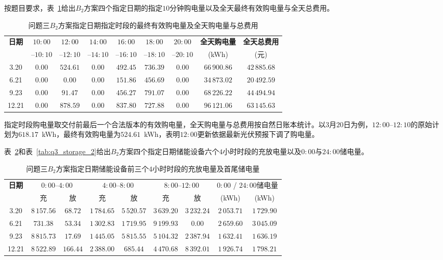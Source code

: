 \documentclass[12pt,a4paper]{ctexart}
\theoremstyle{definition}
\theoremstyle{plain}
\theoremstyle{remark}
\begin{document}
按题目要求，表~\ref{tab:q3_purchase_specified}给出$B_2$方案四个指定日期的指定$10$分钟购电量以及全天最终有效购电量与全天总费用。

\begin{table}[H]
\centering
\caption{问题三$B_2$方案指定日期指定时段的最终有效购电量及全天购电量与总费用}
\label{tab:q3_purchase_specified}
\begin{tabular}{c|cccccc|cc}
\toprule
\textbf{日期} & $10{:}00$ & $12{:}00$ & $14{:}00$ & $16{:}00$ & $18{:}00$ & $20{:}00$ & \textbf{全天购电量} & \textbf{全天总费用} \\
 & --$10{:}10$ & --$12{:}10$ & --$14{:}10$ & --$16{:}10$ & --$18{:}10$ & --$20{:}10$ & (kWh) & (元) \\
\midrule
3.20 & $0.00$ & $524.61$ & $0.00$ & $492.45$ & $736.39$ & $0.00$ & $66\,900.86$ & $42\,885.68$ \\
6.21 & $0.00$ & $0.00$ & $0.00$ & $151.86$ & $456.69$ & $0.00$ & $34\,873.02$ & $20\,492.59$ \\
9.23 & $0.00$ & $91.47$ & $0.00$ & $456.27$ & $791.07$ & $0.00$ & $68\,226.22$ & $44\,494.94$ \\
12.21 & $0.00$ & $878.59$ & $0.00$ & $837.80$ & $727.88$ & $0.00$ & $96\,121.06$ & $63\,145.63$ \\
\bottomrule
\end{tabular}
\end{table}

\noindent 指定时段购电量取交付前最后一个合法版本的有效购电量，全天购电量与总费用按自然日账本统计。以$3$月$20$日为例，$12{:}00$--$12{:}10$的原始计划为$618.17$~kWh，最终有效购电量为$524.61$~kWh，表明$12{:}00$更新依据最新光伏预报下调了购电量。

表~\ref{tab:q3_storage_1}和表~\ref{tab:q3_storage_2}给出$B_2$方案四个指定日期储能设备六个$4$小时时段的充放电量以及$0{:}00$与$24{:}00$储电量。

\begin{table}[H]
\centering
\caption{问题三$B_2$方案指定日期储能设备前三个$4$小时时段的充放电量及首尾储电量}
\label{tab:q3_storage_1}
\begin{tabular}{c|cc|cc|cc|cc}
\toprule
\textbf{日期} & \multicolumn{2}{c|}{$0{:}00$--$4{:}00$} & \multicolumn{2}{c|}{$4{:}00$--$8{:}00$} & \multicolumn{2}{c|}{$8{:}00$--$12{:}00$} & \multicolumn{2}{c}{$0{:}00$ / $24{:}00$储电量} \\
 & 充 & 放 & 充 & 放 & 充 & 放 & (kWh) & (kWh) \\
\midrule
3.20 & $8\,157.56$ & $68.72$ & $1\,784.65$ & $5\,520.57$ & $3\,639.20$ & $3\,232.24$ & $2\,053.71$ & $1\,729.90$ \\
6.21 & $731.38$ & $53.34$ & $1\,302.83$ & $1\,719.95$ & $9\,199.93$ & $0.00$ & $2\,659.60$ & $3\,045.09$ \\
9.23 & $8\,815.73$ & $17.69$ & $1\,445.05$ & $5\,815.55$ & $5\,104.32$ & $2\,387.94$ & $1\,632.41$ & $1\,636.19$ \\
12.21 & $8\,522.89$ & $166.44$ & $2\,388.00$ & $685.44$ & $4\,470.68$ & $8\,392.01$ & $1\,926.74$ & $1\,798.21$ \\
\bottomrule
\end{tabular}
\end{table}
\end{document}
